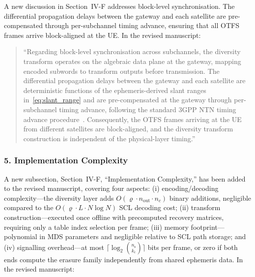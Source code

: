 A new discussion in Section~IV-F addresses block-level synchronisation. The differential propagation delays between the gateway and each satellite are pre-compensated through per-subchannel timing advance, ensuring that all OTFS frames arrive block-aligned at the UE. In the revised manuscript:

\begin{quote}
``{\color{blue}Regarding block-level synchronisation across subchannels, the
diversity transform operates on the algebraic data plane at the
gateway, mapping encoded subwords to transform outputs before
transmission. The differential propagation delays between the
gateway and each satellite are deterministic functions of the
ephemeris-derived slant ranges in~\eqref{eq:slant_range} and are
pre-compensated at the gateway through per-subchannel timing
advance, following the standard 3GPP NTN timing advance
procedure~\cite{3GPP38821}. Consequently, the OTFS frames
arriving at the UE from different satellites are block-aligned,
and the diversity transform construction is independent of the
physical-layer timing.}''
\end{quote}

\subsubsection*{5. Implementation Complexity}

A new subsection, Section~IV-F, ``Implementation Complexity,'' has been added to the revised manuscript, covering four aspects: (i) encoding/decoding complexity---the diversity layer adds $O(\varrho \cdot n_{\mathrm{out}} \cdot n_c)$ binary additions, negligible compared to the $O(\varrho \cdot L \cdot N \log N)$ SCL decoding cost; (ii) transform construction---executed once offline with precomputed recovery matrices, requiring only a table index selection per frame; (iii) memory footprint---polynomial in MDS parameters and negligible relative to SCL path storage; and (iv) signalling overhead---at most $\lceil\log_2\binom{n_{\mathrm{s}}}{k_{\mathrm{c}}}\rceil$ bits per frame, or zero if both ends compute the erasure family independently from shared ephemeris data. In the revised manuscript:

